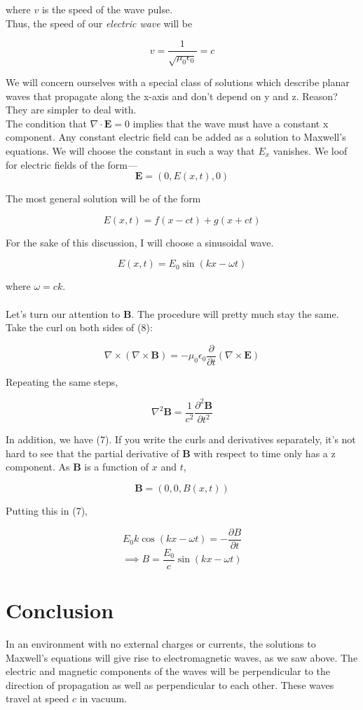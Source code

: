 \documentclass[12pt]{article}
\begin{document}
where $v$ is the speed of the wave pulse. \\
Thus, the speed of our \textit{electric wave} will be 

\[v=\frac{1}{\sqrt{\mu_0\epsilon_0}}=c\]

We will concern ourselves with a special class of solutions which describe planar waves that propagate along the x-axis and don't depend on y and z.
Reason? They are simpler to deal with.\\
The condition that $\nabla\cdot\mathbf{E}=0$ implies that the wave must have a constant x component. 
Any constant electric field can be added as a solution to Maxwell's equations. We will choose the constant in such a way that $E_x$ vanishes.
We loof for electric fields of the form--- 
\[\mathbf{E}=(0,E(x,t),0)\]

The most general solution will be of the form 

\[E(x,t) = f(x-ct)+g(x+ct)\]

For the sake of this discussion, I will choose a sinusoidal wave. 

\[E(x,t) = E_0\sin(kx-\omega t)\]

where $\omega = ck$. \\ \\
Let's turn our attention to $\mathbf{B}$. The procedure will pretty much stay the same. Take
the curl on both sides of (8):

\[\nabla\times(\nabla\times\mathbf{B})=-\mu_0\epsilon_0\frac{\partial}{\partial t}(\nabla\times \mathbf{E})\]

Repeating the same steps,

\[\nabla^2\mathbf{B}=\frac{1}{c^2}\frac{\partial^2 \mathbf{B}}{\partial t^2}\]

In addition, we have (7). If you write the curls and derivatives separately, it's not hard to see that 
the partial derivative of $\mathbf{B}$ with respect to time only has a z component. As $\mathbf{B}$ is a function of $x$
and $t$,

\[\mathbf{B} = (0,0,B(x,t))\]

Putting this in (7), 

\[E_0 k \cos(kx-\omega t)=-\frac{\partial B}{\partial t}\]
\[\implies B = \frac{E_0}{c}\sin (kx-\omega t)\]

\section{Conclusion}
In an environment with no external charges or currents, the solutions to Maxwell's equations will give rise to electromagnetic waves, as we saw above. 
The electric and magnetic components of the waves will be perpendicular to the direction of propagation as well as perpendicular to each other. These waves 
travel at speed $c$ in vacuum. 
\end{document}
